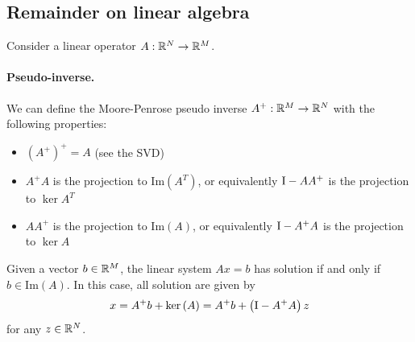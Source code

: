 \documentclass[a4paper,10pt]{article}
\begin{document}
\subsection{Remainder on linear algebra}
    Consider a linear operator $A: \mathbb{R}^N \to \mathbb{R}^M$.
    \paragraph{Pseudo-inverse.} We can define the Moore-Penrose pseudo inverse $A^+:\mathbb{R}^M \to \mathbb{R}^N$ with the following properties:
    \begin{itemize}
        \item[] $(A^+)^+ = A$ (see the SVD)
        \item[] $A^+ A$ is the projection to $\mathrm{Im}(A^T)$, or equivalently $\mathrm{I} - A A^+$ is the projection to $\ker{A^T}$
        \item[] $A A^+$ is the projection to $\mathrm{Im}(A)$, or equivalently $\mathrm{I} - A^+ A$ is the projection to $\ker{A}$
    \end{itemize}
    Given a vector $b \in \mathbb{R}^M$, the linear system $Ax = b$ has solution if and only if $b \in \mathrm{Im}(A)$. In this case, all solution are given by 
    \begin{equation*}
        x = A^+b + \mathrm{ker}\left( {A} \right) = A^+b + \left( \mathrm{I} - A^+ A \right) z 
    \end{equation*}
    for any $z \in \mathbb{R}^N$.

      
\end{document}

